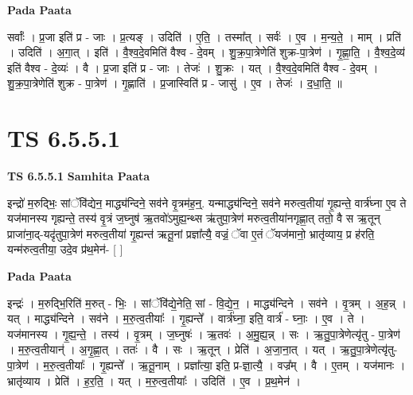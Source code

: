 \documentclass[17pt]{extarticle}
\begin{document}
\textbf{Pada Paata} \newline

सर्वाः᳚ । प्र॒जा इति॑ प्र - जाः । प्र॒त्यङ् । उदिति॑ । ए॒ति॒ । तस्मा᳚त् । सर्वः॑ । ए॒व । म॒न्य॒ते॒ । माम् । प्रति॑ । उदिति॑ । अ॒गा॒त् । इति॑ । वै॒श्व॒दे॒वमिति॑ वैश्व - दे॒वम् । शु॒क्र॒पा॒त्रेणेति॑ शुक्र-पा॒त्रेण॑ । गृ॒ह्णा॒ति॒ । वै॒श्व॒दे॒व्य॑ इति॑ वैश्व - दे॒व्यः॑ । वै । प्र॒जा इति॑ प्र - जाः । तेजः॑ । शु॒क्रः । यत् । वै॒श्व॒दे॒वमिति॑ वैश्व - दे॒वम् । शु॒क्र॒पा॒त्रेणेति॑ शुक्र - पा॒त्रेण॑ । गृ॒ह्णाति॑ । प्र॒जास्विति॑ प्र - जासु॑ । ए॒व । तेजः॑ । द॒धा॒ति॒ ॥  \newline




\section*{ TS 6.5.5.1 }

\textbf{TS 6.5.5.1 } \newline
\textbf{Samhita Paata} \newline

इन्द्रो॑ म॒रुद्भिः॒ सांॅवि॑द्येन॒ माद्ध्य॑न्दिने॒ सव॑ने वृ॒त्रम॑ह॒न्॒. यन्माद्ध्य॑न्दिने॒ सव॑ने मरुत्व॒तीया॑ गृ॒ह्यन्ते॒ वार्त्र॑घ्ना ए॒व ते यज॑मानस्य गृह्यन्ते॒ तस्य॑ वृ॒त्रं ज॒घ्नुष॑ ऋ॒तवो॑ऽमुह्य॒न्थ्स ऋ॑तुपा॒त्रेण॑ मरुत्व॒तीया॑नगृह्णा॒त् ततो॒ वै स ऋ॒तून् प्राजा॑ना॒द्-यदृ॑तुपा॒त्रेण॑ मरुत्व॒तीया॑ गृ॒ह्यन्त॑ ऋतू॒नां प्रज्ञा᳚त्यै॒ वज्रं॒ ॅवा ए॒तं ॅयज॑मानो॒ भ्रातृ॑व्याय॒ प्र ह॑रति॒ यन्म॑रुत्व॒तीया॒ उदे॒व प्र॑थ॒मेन॑- [  ] \newline

\textbf{Pada Paata} \newline

इन्द्रः॑ । म॒रुद्भि॒रिति॑ म॒रुत् - भिः॒ । सांॅवि॑द्ये॒नेति॒ सां - वि॒द्ये॒न॒ । माद्ध्य॑न्दिने । सव॑ने । वृ॒त्रम् । अ॒ह॒न्न् । यत् । माद्ध्य॑न्दिने । सव॑ने । म॒रु॒त्व॒तीयाः᳚ । गृ॒ह्यन्ते᳚ । वार्त्र॑घ्ना॒ इति॒ वार्त्र॑ - घ्नाः॒ । ए॒व । ते । यज॑मानस्य । गृ॒ह्य॒न्ते॒ । तस्य॑ । वृ॒त्रम् । ज॒घ्नुषः॑ । ऋ॒तवः॑ । अ॒मु॒ह्य॒न्न् । सः । ऋ॒तु॒पा॒त्रेणेत्यृ॑तु - पा॒त्रेण॑ । म॒रु॒त्व॒तीयान्॑ । अ॒गृ॒ह्णा॒त् । ततः॑ । वै । सः । ऋ॒तून् । प्रेति॑ । अ॒जा॒ना॒त् । यत् । ऋ॒तु॒पा॒त्रेणेत्यृ॑तु-पा॒त्रेण॑ । म॒रु॒त्व॒तीयाः᳚ । गृ॒ह्यन्ते᳚ । ऋ॒तू॒नाम् । प्रज्ञा᳚त्या॒ इति॒ प्र-ज्ञा॒त्यै॒ । वज्र᳚म् । वै । ए॒तम् । यज॑मानः । भ्रातृ॑व्याय । प्रेति॑ । ह॒र॒ति॒ । यत् । म॒रु॒त्व॒तीयाः᳚ । उदिति॑ । ए॒व । प्र॒थ॒मेन॑ ।  \newline
\end{document}
